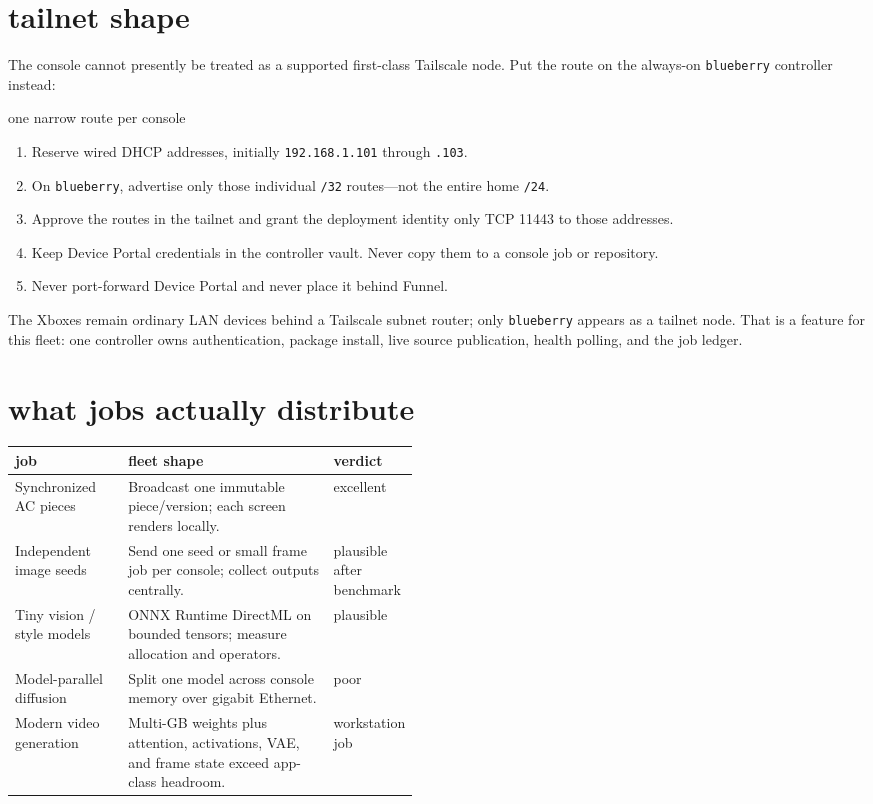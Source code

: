 \documentclass[10pt,letterpaper]{article}
\begin{document}
\section{tailnet shape}

The console cannot presently be treated as a supported first-class Tailscale
node. Put the route on the always-on \texttt{blueberry} controller instead:

\begin{gearcard}{one narrow route per console}
\begin{enumerate}
  \item Reserve wired DHCP addresses, initially
        \texttt{192.168.1.101} through \texttt{.103}.
  \item On \texttt{blueberry}, advertise only those individual \texttt{/32}
        routes---not the entire home \texttt{/24}.
  \item Approve the routes in the tailnet and grant the deployment identity
        only TCP 11443 to those addresses.
  \item Keep Device Portal credentials in the controller vault. Never copy
        them to a console job or repository.
  \item Never port-forward Device Portal and never place it behind Funnel.
\end{enumerate}
\end{gearcard}

The Xboxes remain ordinary LAN devices behind a Tailscale subnet router; only
\texttt{blueberry} appears as a tailnet node. That is a feature for this fleet:
one controller owns authentication, package install, live source publication,
health polling, and the job ledger.

\section{what jobs actually distribute}

\begin{tabularx}{\linewidth}{@{}p{0.29\linewidth}Y p{0.18\linewidth}@{}}
\toprule
\textbf{job} & \textbf{fleet shape} & \textbf{verdict} \\
\midrule
Synchronized AC pieces & Broadcast one immutable piece/version; each screen renders locally. & excellent \\
Independent image seeds & Send one seed or small frame job per console; collect outputs centrally. & plausible after benchmark \\
Tiny vision / style models & ONNX Runtime DirectML on bounded tensors; measure allocation and operators. & plausible \\
Model-parallel diffusion & Split one model across console memory over gigabit Ethernet. & poor \\
Modern video generation & Multi-GB weights plus attention, activations, VAE, and frame state exceed app-class headroom. & workstation job \\
\bottomrule
\end{tabularx}
\end{document}
